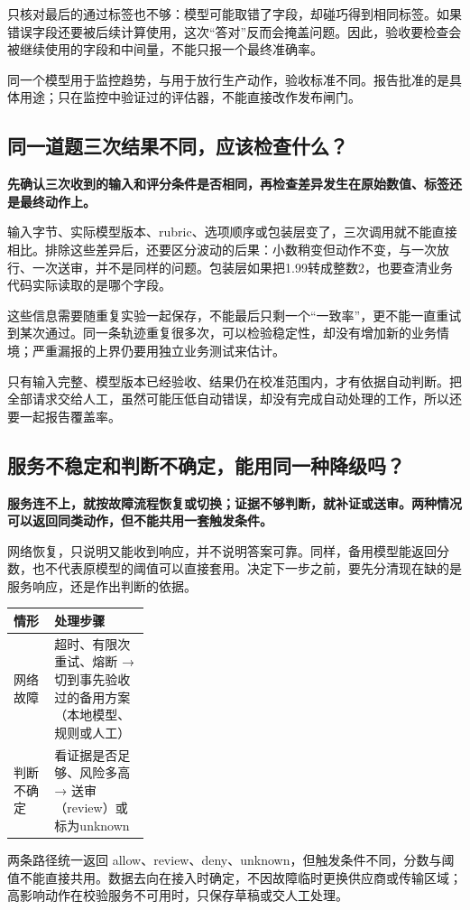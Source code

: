 \documentclass[a4paper,11pt]{ctexart}
\newenvironment{exhibit}[2]{%
  \par\medskip\noindent{\color{accent}\bfseries #1}\quad{\itshape #2}\par\smallskip\small
}{\par\bigskip\normalsize}
\begin{document}
只核对最后的通过标签也不够：模型可能取错了字段，却碰巧得到相同标签。如果错误字段还要被后续计算使用，这次“答对”反而会掩盖问题。因此，验收要检查会被继续使用的字段和中间量，不能只报一个最终准确率。

同一个模型用于监控趋势，与用于放行生产动作，验收标准不同。报告批准的是具体用途；只在监控中验证过的评估器，不能直接改作发布闸门。

\subsection{同一道题三次结果不同，应该检查什么？}
\noindent\textbf{先确认三次收到的输入和评分条件是否相同，再检查差异发生在原始数值、标签还是最终动作上。}\par\medskip

输入字节、实际模型版本、rubric、选项顺序或包装层变了，三次调用就不能直接相比。排除这些差异后，还要区分波动的后果：小数稍变但动作不变，与一次放行、一次送审，并不是同样的问题。包装层如果把1.99转成整数2，也要查清业务代码实际读取的是哪个字段。

这些信息需要随重复实验一起保存，不能最后只剩一个“一致率”，更不能一直重试到某次通过。同一条轨迹重复很多次，可以检验稳定性，却没有增加新的业务情境；严重漏报的上界仍要用独立业务测试来估计。

只有输入完整、模型版本已经验收、结果仍在校准范围内，才有依据自动判断。把全部请求交给人工，虽然可能压低自动错误，却没有完成自动处理的工作，所以还要一起报告覆盖率。

\subsection{服务不稳定和判断不确定，能用同一种降级吗？}
\noindent\textbf{服务连不上，就按故障流程恢复或切换；证据不够判断，就补证或送审。两种情况可以返回同类动作，但不能共用一套触发条件。}\par\medskip

网络恢复，只说明又能收到响应，并不说明答案可靠。同样，备用模型能返回分数，也不代表原模型的阈值可以直接套用。决定下一步之前，要先分清现在缺的是服务响应，还是作出判断的依据。

\begin{exhibit}{图 4.3}{网络故障与判断不确定分别处理}
\begingroup\small\setlength{\tabcolsep}{5pt}\renewcommand{\arraystretch}{1.25}\keepXColumns
\begin{tabularx}{\linewidth}{L{0.30\linewidth} X}
\toprule
\textbf{情形} & \textbf{处理步骤} \\
\midrule
网络故障 & 超时、有限次重试、熔断 → 切到事先验收过的备用方案（本地模型、规则或人工） \\
判断不确定 & 看证据是否足够、风险多高 → 送审（review）或标为unknown \\
\bottomrule
\end{tabularx}
\endgroup

\small 两条路径统一返回 allow、review、deny、unknown，但触发条件不同，分数与阈值不能直接共用。数据去向在接入时确定，不因故障临时更换供应商或传输区域；高影响动作在校验服务不可用时，只保存草稿或交人工处理。
\end{exhibit}
\end{document}
